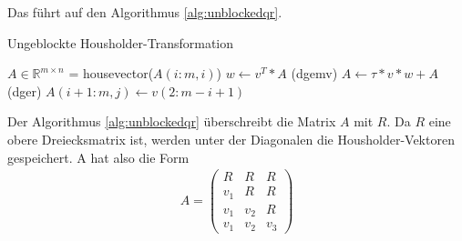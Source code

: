 Das führt auf den Algorithmus \ref{alg:unblockedqr}. 
\begin{algorithm}
	\caption{Ungeblockte Housholder-Transformation}
	\begin{algorithmic}
	\State $A \in \mathbb{R}^{m \times n}$
		\State [$v$, $\tau$] = housevector($A(i:m,i)$)
		\State $w \leftarrow v^T*A$ (dgemv)
		\State $ A \leftarrow \tau * v * w + A $ (dger)
			\State $A(i + 1 : m, j) \leftarrow v(2 : m - i + 1)$
		\EndIf
	\EndFor	
\end{algorithmic} 
\label{alg:unblockedqr}
\end{algorithm}



Der Algorithmus \ref{alg:unblockedqr} überschreibt die Matrix $A$ mit $R$. Da $R$ eine obere Dreiecksmatrix ist, werden unter der Diagonalen die Housholder-Vektoren gespeichert. A hat also die Form
\begin{align*}
	A = 
	\left(\begin{array}{ccc}
	R   &  R  & R \\ 
	v_1 &  R  & R \\ 
	v_1 & v_2 & R \\ 
	v_1 & v_2 & v_3
	\end{array} \right)
\end{align*}




%
%



